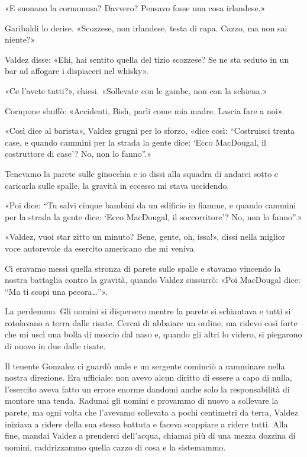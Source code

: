 «E suonano la cornamusa? Davvero? Pensavo fosse una cosa irlandese.»

Garibaldi lo derise. «Scozzese, non irlandese, testa di rapa. Cazzo, ma
non sai niente?»

Valdez disse: «Ehi, hai sentito quella del tizio scozzese? Se ne sta
seduto in un bar ad affogare i dispiaceri nel whisky».

«Ce l'avete tutti?», chiesi. «Sollevate con le gambe, non con la
schiena.»

Cornpone sbuffò: «Accidenti, Bish, parli come mia madre. Lascia fare a
noi».

«Così dice al barista», Valdez grugnì per lo sforzo, «dice così:
``Costruisci trenta case, e quando cammini per la strada la gente dice:
`Ecco MacDougal, il costruttore di case'? No, non lo fanno''.»

Tenevamo la parete sulle ginocchia e io dissi alla squadra di andarci
sotto e caricarla sulle spalle, la gravità in eccesso mi stava
uccidendo.

«Poi dice: ``Tu salvi cinque bambini da un edificio in fiamme, e quando
cammini per la strada la gente dice: `Ecco MacDougal, il soccorritore'?
No, non lo fanno''.»

«Valdez, vuoi star zitto un minuto? Bene, gente, oh, issa!», dissi nella
miglior voce autorevole da esercito americano che mi veniva.

Ci eravamo messi quella stronza di parete sulle spalle e stavamo
vincendo la nostra battaglia contro la gravità, quando Valdez sussurrò:
«Poi MacDougal dice: ``Ma ti scopi una pecora\ldots''».

La perdemmo. Gli uomini si dispersero mentre la parete si schiantava e
tutti si rotolavano a terra dalle risate. Cercai di abbaiare un ordine,
ma ridevo così forte che mi uscì una bolla di moccio dal naso e, quando
gli altri lo videro, si piegarono di nuovo in due dalle risate.

Il tenente Gonzalez ci guardò male e un sergente cominciò a camminare
nella nostra direzione. Era ufficiale: non avevo alcun diritto di essere
a capo di nulla, l'esercito aveva fatto un errore enorme dandomi anche
solo la responsabilità di montare una tenda. Radunai gli uomini e
provammo di nuovo a sollevare la parete, ma ogni volta che l'avevamo
sollevata a pochi centimetri da terra, Valdez iniziava a ridere della
sua stessa battuta e faceva scoppiare a ridere tutti. Alla fine, mandai
Valdez a prenderci dell'acqua, chiamai più di una mezza dozzina di
uomini, raddrizzammo quella cazzo di cosa e la sistemammo.

